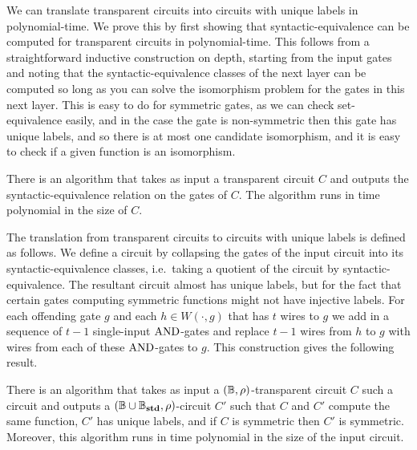 \documentclass[a4paper,UKenglish]{lipics-v2018}
\begin{document}
We can translate transparent circuits into circuits with unique labels in
polynomial-time. We prove this by first showing that syntactic-equivalence can
be computed for transparent circuits in polynomial-time. This follows from a
straightforward inductive construction on depth, starting from the input gates
and noting that the syntactic-equivalence classes of the next layer can be
computed so long as you can solve the isomorphism problem for the gates in this
next layer. This is easy to do for symmetric gates, as we can check
set-equivalence easily, and in the case the gate is non-symmetric then this gate
has unique labels, and so there is at most one candidate isomorphism, and it is
easy to check if a given function is an isomorphism.

\begin{lemma}
  There is an algorithm that takes as input a transparent circuit $C$ and
  outputs the syntactic-equivalence relation on the gates of $C$. The algorithm
  runs in time polynomial in the size of $C$.
  \label{lem:transparent-syntactic-equiv}
\end{lemma}

The translation from transparent circuits to circuits with unique labels is
defined as follows. We define a circuit by collapsing the gates of the input
circuit into its syntactic-equivalence classes, i.e.\ taking a quotient of the
circuit by syntactic-equivalence. The resultant circuit almost has unique
labels, but for the fact that certain gates computing symmetric functions might
not have injective labels. For each offending gate $g$ and each $h \in W(\cdot,
g)$ that has $t$ wires to $g$ we add in a sequence of $t-1$ single-input
$\text{\upshape AND}$-gates and replace $t-1$ wires from $h$ to $g$ with wires from each of
these $\text{\upshape AND}$-gates to $g$. This construction gives the following result.

\begin{lemma}
  There is an algorithm that takes as input a $(\mathbb{B}, \rho)$-transparent circuit
  $C$ such a circuit and outputs a $(\mathbb{B} \cup \mathbb{B}_{\text{\textbf{std}}},
  \rho)$-circuit $C'$ such that $C$ and $C'$ compute the same function, $C'$ has
  unique labels, and if $C$ is symmetric then $C'$ is symmetric. Moreover, this
  algorithm runs in time polynomial in the size of the input circuit.
  \label{lem:transparent-unique}
\end{lemma}

\end{document}
